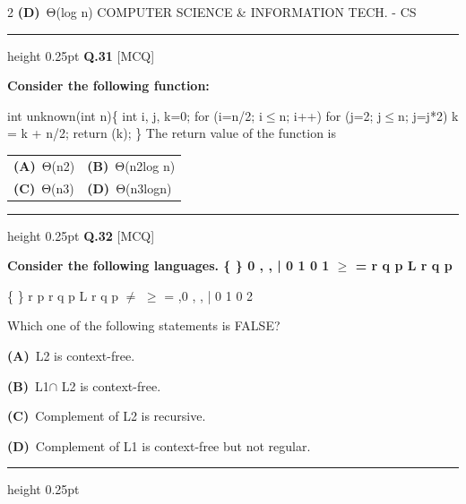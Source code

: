 \documentclass[a4paper,10pt,twoside]{article}
\begin{document}
\begin{multicols}{2}
\textbf{(D)}~Θ(log n)  COMPUTER SCIENCE \& INFORMATION TECH. - CS
\par\vspace{6pt}\hrule height 0.25pt\vspace{6pt}
\noindent\textbf{Q.31} \hfill {\footnotesize\textsf{[MCQ]}}
\par\vspace{2pt}
{\bfseries Consider the following function:
\par\smallskip
int unknown(int n)\{
int i, j, k=0;
for (i=n/2; i$\le$n; i++)
for (j=2; j$\le$n; j=j*2)
k = k + n/2;
return (k);
\}
The return value of the function is \par}
\par\vspace{2pt}\noindent
\begin{tabular*}{\columnwidth}{@{\extracolsep{\fill}}p{}p{}@{}}
\textbf{(A)}~Θ(n2) & \textbf{(B)}~Θ(n2log n) \\
\addlinespace[2pt]
\textbf{(C)}~Θ(n3) & \textbf{(D)}~Θ(n3logn)
\end{tabular*}
\par\vspace{6pt}\hrule height 0.25pt\vspace{6pt}
\noindent\textbf{Q.32} \hfill {\footnotesize\textsf{[MCQ]}}
\par\vspace{2pt}
{\bfseries Consider the following languages.
\{
\}
0
,
,
|
0
1
0
1
$\ge$
=
r
q
p
L
r
q
p
\par\smallskip
\{
\}
r
p
r
q
p
L
r
q
p
$\ne$
$\ge$
=
,0
,
,
|
0
1
0
2
\par\smallskip
Which one of the following statements is FALSE? \par}
\par\vspace{2pt}\noindent
\textbf{(A)}~L2 is context-free.\par\vspace{2pt}\noindent
\textbf{(B)}~L1$\cap$ L2 is context-free.\par\vspace{2pt}\noindent
\textbf{(C)}~Complement of L2 is recursive.\par\vspace{2pt}\noindent
\textbf{(D)}~Complement of L1 is context-free but not regular.
\par\vspace{6pt}\hrule height 0.25pt\vspace{6pt}

\end{multicols}
\end{document}
